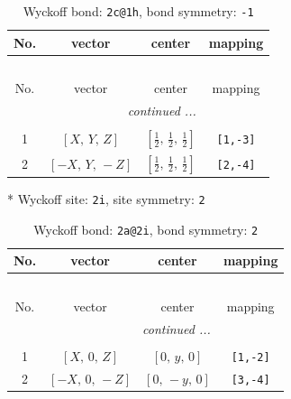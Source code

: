 \documentclass[fleqn,8pt]{jsarticle}
\begin{document}
\begin{longtable}{cccc}
\caption{Wyckoff bond: {\tt 2c@1h}, bond symmetry: {\tt -1}}
 \\
 \hline \hline
No. & vector & center & mapping \\ \hline \endfirsthead

\multicolumn{3}{l}{\tablename\ \thetable{}} \\
 \hline \hline
No. & vector & center & mapping \\ \hline \endhead

 \hline \hline
\multicolumn{3}{r}{\footnotesize\it continued ...} \\ \endfoot

 \hline \hline
\multicolumn{3}{r}{} \\ \endlastfoot

1 & $\left[ X,\, Y,\, Z \right]$ & $\left[ \frac{1}{2},\, \frac{1}{2},\, \frac{1}{2} \right]$ & {\tt [1,-3]} \\ \hline
2 & $\left[ - X,\, Y,\, - Z \right]$ & $\left[ \frac{1}{2},\, \frac{1}{2},\, \frac{1}{2} \right]$ & {\tt [2,-4]} \\
\end{longtable}
* Wyckoff site: {\tt 2i}, site symmetry: {\tt 2}
\renewcommand{\arraystretch}{1.2}
\begin{longtable}{cccc}
\caption{Wyckoff bond: {\tt 2a@2i}, bond symmetry: {\tt 2}}
 \\
 \hline \hline
No. & vector & center & mapping \\ \hline \endfirsthead

\multicolumn{3}{l}{\tablename\ \thetable{}} \\
 \hline \hline
No. & vector & center & mapping \\ \hline \endhead

 \hline \hline
\multicolumn{3}{r}{\footnotesize\it continued ...} \\ \endfoot

 \hline \hline
\multicolumn{3}{r}{} \\ \endlastfoot

1 & $\left[ X,\, 0,\, Z \right]$ & $\left[ 0,\, y,\, 0 \right]$ & {\tt [1,-2]} \\ \hline
2 & $\left[ - X,\, 0,\, - Z \right]$ & $\left[ 0,\, - y,\, 0 \right]$ & {\tt [3,-4]} \\
\end{longtable}
\renewcommand{\arraystretch}{1.2}
\end{document}

